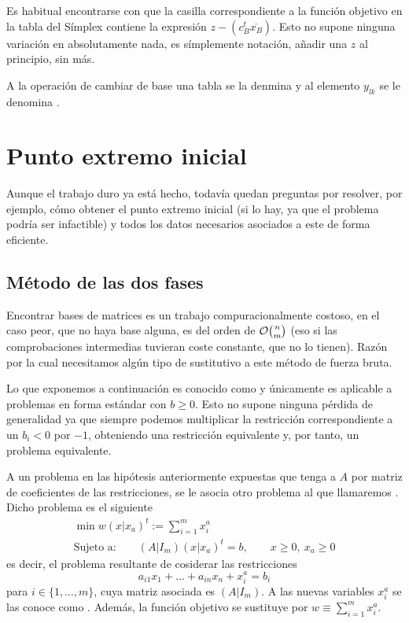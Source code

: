 \begin{obs}[Notación]
	Es habitual encontrarse con que la casilla correspondiente a la función objetivo en la tabla del Símplex contiene la expresión $z-(c_B^t\overline{x_B})$. Esto no supone ninguna variación en absolutamente nada, es símplemente notación, añadir una $z$ al principio, sin más.
\end{obs}

A la operación de cambiar de base una tabla se la denmina  y al elemento $y_{lk}$ se le denomina .
\section{Punto extremo inicial}
Aunque el trabajo duro ya está hecho, todavía quedan preguntas por resolver, por ejemplo, cómo obtener el punto extremo inicial (si lo hay, ya que el problema podría ser infactible) y todos los datos necesarios asociados a este de forma eficiente.
\subsection{Método de las dos fases}
Encontrar bases de matrices es un trabajo compuracionalmente costoso, en el caso peor, que no haya base alguna, es del orden de $\mathcal{O}\binom{n}{m}$ (eso si las comprobaciones intermedias tuvieran coste constante, que no lo tienen). Razón por la cual necesitamos algún tipo de sustitutivo a este método de fuerza bruta.

Lo que exponemos a continuación es conocido como  y únicamente es aplicable a problemas en forma estándar con $b\geq 0$. Esto no supone ninguna pérdida de generalidad ya que siempre podemos multiplicar la restricción correspondiente a un $b_i<0$ por $-1$, obteniendo una restricción equivalente y, por tanto, un problema equivalente.

A un problema en las hipótesis anteriormente expuestas que tenga a $A$ por matriz de coeficientes de las restricciones, se le asocia otro problema al que llamaremos . Dicho problema es el siguiente
\begin{equation*}
	\begin{array}{c}
		\min w(x|x_a)^t:=\sum_{i=1}^{m}x_i^a\\
		\text{Sujeto a:}\qquad (A|I_m)(x|x_a)^t=b,\qquad x\geq 0,\ x_a\geq 0
	\end{array}
\end{equation*}
es decir, el problema resultante de cosiderar las restricciones
\begin{equation*}
	a_{i1}x_1+\dots+a_{in}x_n+x_i^a=b_i
\end{equation*}
para $i\in\{1,\dots,m\}$, cuya matriz asociada es $(A|I_m)$. A las nuevas variables $x_i^a$ se las conoce como . Además, la función objetivo se sustituye por $w\equiv \sum_{i=1}^{m}x_i^a$.

